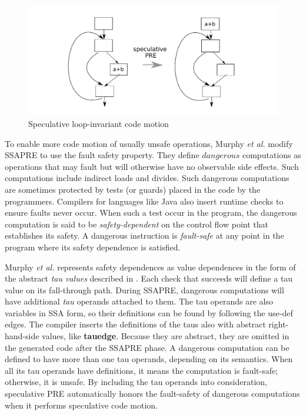 \begin{figure}
\centering
\includegraphics[scale=0.55]{fig-spec-pre.pdf}
\caption{Speculative loop-invariant code motion}
\label{fig: spec-pre}
\end{figure}

To enable more code motion of usually unsafe operations, Murphy {\it et al.} 
modify SSAPRE to use the fault safety property.   They define $dangerous$
computations as operations that may fault but will otherwise have no observable
side effects.  Such computations include indirect loads and divides.  Such
dangerous computations are sometimes protected by tests (or guards) placed in
the code by the programmers.  Compilers for languages like Java also insert 
runtime checks to ensure faults never occur. When such a test occur in the
program, the dangerous computation is said to be \emph{safety-dependent} on
the control flow point that establishes its safety.  A dangerous instruction
is \emph{fault-safe} at any point in the program where its safety dependence
is satisfied.

Murphy {\it et al.} represents safety dependences as value dependences in the
form of the abstract \emph{tau values} described in \cite{Menon06}.  Each check
that succeeds will define a tau value on its fall-through path.  During SSAPRE,
dangerous computations will have additional \emph{tau} operands attached to 
them.  The tau
operands are also variables in SSA form, so their definitions can
be found by following the use-def edges.  The compiler inserts the definitions
of the taus also with abstract right-hand-side values, like {\bf tauedge}.
Because they are abstract, they
are omitted in the generated code after the SSAPRE phase.  A dangerous
computation can be defined to have more than one tau operands, depending on
its semantics.  When all its tau operands have definitions, 
it means the computation is fault-safe; otherwise, it is unsafe.  
By including the tau operands into consideration, speculative PRE automatically
honors the fault-safety of dangerous computations when it performs speculative
code motion.


